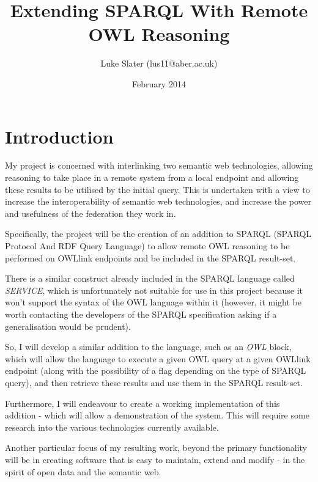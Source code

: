 \documentclass{article}
\begin{document}
\setlength{\parskip}{\medskipamount}
\setlength{\parindent}{0pt}

\title{Extending SPARQL With Remote OWL Reasoning}
\author{Luke Slater (lus11@aber.ac.uk)}
\date{February 2014}

\maketitle

\pagebreak

\section{Introduction}

My project is concerned with interlinking two semantic web technologies,
allowing reasoning to take place in a remote system from a local endpoint and
allowing these results to be utilised by the initial query. This is undertaken
with a view to increase the interoperability of semantic web technologies, and
increase the power and usefulness of the federation they work in.

Specifically, the project will be the creation of an addition to
SPARQL\cite{sparql} (SPARQL Protocol And RDF Query Language) to allow remote
OWL\cite{owlprimer} reasoning to be performed on OWLlink endpoints and be included in the
SPARQL result-set.

There is a similar construct already included in the SPARQL language called
\emph{SERVICE}, which is unfortunately not suitable for use in this project
because it won't support the syntax of the OWL language within it (however, it
might be worth contacting the developers of the SPARQL specification asking if a
generalisation would be prudent).

So, I will develop a similar addition to the language, such as an \emph{OWL}
block, which will allow the language to execute a given OWL query at a given
OWLlink endpoint (along with the possibility of a flag depending on the type of
SPARQL query), and then retrieve these results and use them in the SPARQL
result-set.

Furthermore, I will endeavour to create a working implementation of this
addition - which will allow a demonstration of the system. This will require
some research into the various technologies currently available.

Another particular focus of my resulting work, beyond the primary functionality
will be in creating software that is easy to maintain, extend and modify - in
the spirit of open data and the semantic web.
\end{document}
